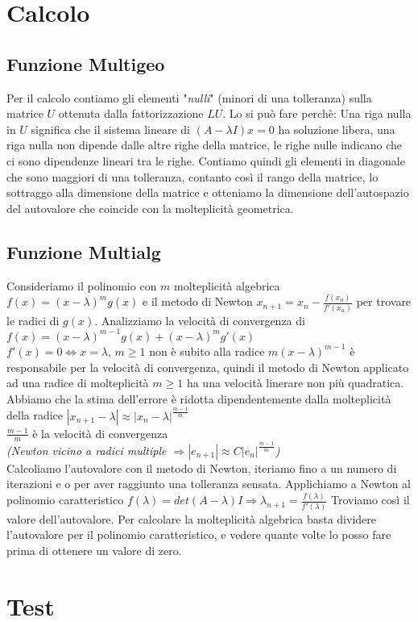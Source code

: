 \documentclass[10pt]{article}
\begin{document}
    \section{Calcolo}
    \subsection{Funzione Multigeo}
    Per il calcolo contiamo gli elementi "\textit{nulli}" (minori di una tolleranza) sulla matrice $U$ ottenuta dalla fattorizzazione $LU$. Lo si può fare perchè:
    Una riga nulla in $U$ significa che il sistema lineare di $(A-\lambda I)x = 0$ ha soluzione libera, una riga nulla non dipende dalle altre righe della matrice, le righe nulle indicano che ci sono dipendenze lineari tra le righe.
    Contiamo quindi gli elementi in diagonale che sono maggiori di una tolleranza, contanto così il rango della matrice, lo sottraggo alla dimensione della matrice e otteniamo la dimensione dell'autospazio del autovalore che coincide con la molteplicità geometrica.
    \subsection{Funzione Multialg}
    Consideriamo il polinomio con $m$ molteplicità algebrica $f(x)=(x-\lambda)^m g(x)$ e il metodo di Newton $x_{n+1}=x_n - \frac{f(x_n)}{f'(x_n)}$ per trovare le radici di $g(x)$.
    Analizziamo la velocità di convergenza di $f(x)=(x-\lambda)^{m-1} g(x) + (x-\lambda)^m g'(x)$\\
    $f'(x) = 0 \iff x = \lambda$, $m \geq 1$ non è subito alla radice $m(x-\lambda)^{m-1}$ è responsabile per la velocità di convergenza, quindi il metodo di Newton applicato ad una radice di molteplicità $m\geq 1$ ha una velocità linerare non più quadratica.\\
    Abbiamo che la stima dell'errore è ridotta dipendentemente dalla molteplicità della radice $|x_{n+1}-\lambda| \approx |x_n - \lambda|^{\frac{m-1}{m}}$\\
    $\frac{m-1}{m}$ è la velocità di convergenza\\ \textit{(Newton vicino a radici multiple $\Rightarrow |e_{n+1}| \approx C|e_n|^{\frac{m-1}{m}}$)}\\
    Calcoliamo l'autovalore con il metodo di Newton, iteriamo fino a un numero di iterazioni e o per aver raggiunto una tolleranza sensata. Applichiamo a Newton al polinomio caratteristico $f(\lambda) = det(A-\lambda)I \Rightarrow \lambda_{n+1} = \frac{f(\lambda)}{f'(\lambda)}$ Troviamo così il valore dell'autovalore.
    Per calcolare la molteplicità algebrica basta dividere l'autovalore per il polinomio caratteristico, e vedere quante volte lo posso fare prima di ottenere un valore di zero.
    \section{Test}
    
\end{document}
